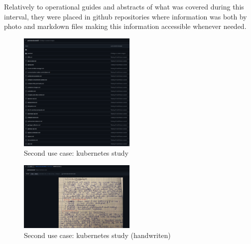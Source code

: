 Relatively to operational guides and abstracts of what was covered during this interval, they were placed in github repositories where information was both by photo and markdown files making this information accessible whenever needed.

\begin{figure}[H]
    \centering
    \includegraphics[width=0.5\textwidth]{assets/use-case-2/kubernetes-study.png} %
    \caption{Second use case: kubernetes study}
    \label{fig:sample-image} 
\end{figure}

\begin{figure}[H]
    \centering
    \includegraphics[width=0.5\textwidth]{assets/use-case-2/kubernetes-study2.png} %
    \caption{Second use case: kubernetes study (handwriten)}
    \label{fig:sample-image} 
\end{figure}

